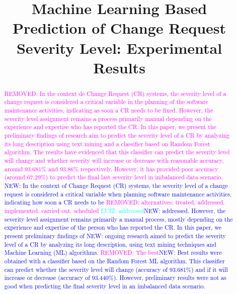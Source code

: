 \documentclass[10pt, conference]{IEEEtran}
\newcommand{\luiz}[1]{\noindent\textcolor{cyan}{LUIZ: {#1}}}
\newcommand{\rem}[1]{\noindent\textcolor{magenta}{REMOVED: {#1}}}
\newcommand{\new}[1]{\noindent\textcolor{blue}{NEW: {#1}}}
\newcommand{\luiz}[1]{}
\newcommand{\rem}[1]{}
\newcommand{\new}[1]{#1}
\begin{document}
\title{Machine Learning Based Prediction of Change Request Severity Level: Experimental Results}

\author{
\and
{}
}

\maketitle

\begin{abstract}
\rem{In the context de Change Request (CR) systems, the severity level of a change request is considered a critical variable in the planning of the software maintenance activities, indicating as soon a CR needs to be fixed. However, the severity level assignment remains a process primarily manual depending on the experience and expertise who has reported the CR. In this paper, we present the preliminary findings of research aim to predict the severity level of a CR by analyzing its long description using text mining and a classifier based on Random Forest algorithm. The results have evidenced that this classifier can predict the severity level will change and whether severity will increase or decrease with reasonable accuracy, around 93.681\% and 93.86\% respectively. However, it has provided poor accuracy (around 67,29\%) to predict the final last severity level in imbalanced data scenario.} \new{In the context of Change Request (CR) systems, the severity level of a change request is considered a critical variable when planning software maintenance activities, indicating how soon a CR needs to be \rem{alternatives: treated, addressed, implemented, carried out, scheduled} \luiz{addressed}\new{addressed}. However, the severity level assignment remains primarily a manual process, mostly depending on the experience and expertise of the person who has reported the CR. In this paper, we present preliminary findings of \new{ongoing} research aimed to predict the severity level of a CR by analyzing its long description, using text mining techniques and Machine Learning (ML) algorithms. \rem{The best}\new{Best} results were obtained with a classifier based on the Random Forest ML algorithm. This classifier can predict whether the severity level will change (accuracy of 93.681\%) and if it will increase or decrease (accuracy of 93.440\%). However, preliminary results were not as good when predicting the final severity level in an imbalanced data scenario.} 

\end{abstract}
\end{document}
